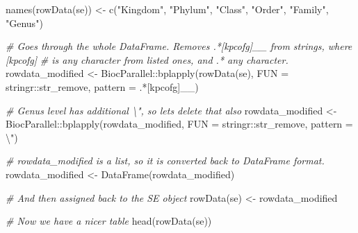 \documentclass[
]{book}
\newenvironment{Shaded}{\begin{snugshade}}{\end{snugshade}}
\newcommand{\AttributeTok}[1]{\textcolor[rgb]{0.77,0.63,0.00}{#1}}
\newcommand{\CommentTok}[1]{\textcolor[rgb]{0.56,0.35,0.01}{\textit{#1}}}
\newcommand{\FunctionTok}[1]{\textcolor[rgb]{0.00,0.00,0.00}{#1}}
\newcommand{\NormalTok}[1]{#1}
\newcommand{\OtherTok}[1]{\textcolor[rgb]{0.56,0.35,0.01}{#1}}
\newcommand{\SpecialCharTok}[1]{\textcolor[rgb]{0.00,0.00,0.00}{#1}}
\newcommand{\StringTok}[1]{\textcolor[rgb]{0.31,0.60,0.02}{#1}}
\begin{document}
\begin{Shaded}
\begin{Highlighting}[]
\FunctionTok{names}\NormalTok{(}\FunctionTok{rowData}\NormalTok{(se)) }\OtherTok{\textless{}{-}} \FunctionTok{c}\NormalTok{(}\StringTok{"Kingdom"}\NormalTok{, }\StringTok{"Phylum"}\NormalTok{, }\StringTok{"Class"}\NormalTok{, }\StringTok{"Order"}\NormalTok{, }
                        \StringTok{"Family"}\NormalTok{, }\StringTok{"Genus"}\NormalTok{)}

\CommentTok{\# Goes through the whole DataFrame. Removes \textquotesingle{}.*[kpcofg]\_\_\textquotesingle{} from strings, where [kpcofg] }
\CommentTok{\# is any character from listed ones, and .* any character.}
\NormalTok{rowdata\_modified }\OtherTok{\textless{}{-}}\NormalTok{ BiocParallel}\SpecialCharTok{::}\FunctionTok{bplapply}\NormalTok{(}\FunctionTok{rowData}\NormalTok{(se), }
                                           \AttributeTok{FUN =}\NormalTok{ stringr}\SpecialCharTok{::}\NormalTok{str\_remove, }
                                           \AttributeTok{pattern =} \StringTok{\textquotesingle{}.*[kpcofg]\_\_\textquotesingle{}}\NormalTok{)}

\CommentTok{\# Genus level has additional \textquotesingle{}\textbackslash{}"\textquotesingle{}, so let\textquotesingle{}s delete that also}
\NormalTok{rowdata\_modified }\OtherTok{\textless{}{-}}\NormalTok{ BiocParallel}\SpecialCharTok{::}\FunctionTok{bplapply}\NormalTok{(rowdata\_modified, }
                                           \AttributeTok{FUN =}\NormalTok{ stringr}\SpecialCharTok{::}\NormalTok{str\_remove, }
                                           \AttributeTok{pattern =} \StringTok{\textquotesingle{}}\SpecialCharTok{\textbackslash{}"}\StringTok{\textquotesingle{}}\NormalTok{)}

\CommentTok{\# rowdata\_modified is a list, so it is converted back to DataFrame format. }
\NormalTok{rowdata\_modified }\OtherTok{\textless{}{-}} \FunctionTok{DataFrame}\NormalTok{(rowdata\_modified)}

\CommentTok{\# And then assigned back to the SE object}
\FunctionTok{rowData}\NormalTok{(se) }\OtherTok{\textless{}{-}}\NormalTok{ rowdata\_modified}

\CommentTok{\# Now we have a nicer table}
\FunctionTok{head}\NormalTok{(}\FunctionTok{rowData}\NormalTok{(se))}
\end{Highlighting}
\end{Shaded}
\end{document}
